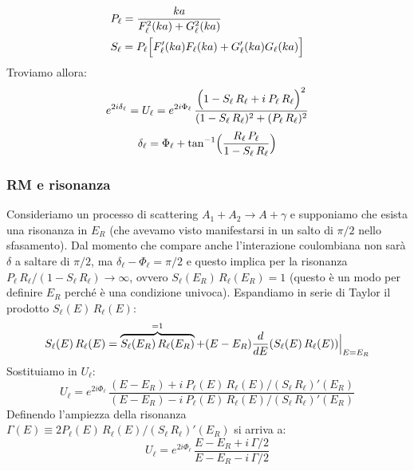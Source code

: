 \begin{displaymath}
	\begin{aligned}
	&P_\ell = \frac{ka}{F_\ell^2 (ka) + G_\ell^2 (ka)}\\ 
	&S_\ell = P_\ell \Bigl [ F_\ell ' (ka) F_\ell (ka) + G_\ell ' (ka)G_\ell (ka) \Bigr ]
	\end{aligned}
\end{displaymath}
Troviamo allora:
$$e^{2i\delta_\ell} = U_\ell = e^{2i\Phi_\ell} \, \frac{\Bigl ( 1-S_\ell\, R_\ell + i\: P_\ell\, R_\ell \Bigr )^2}{(1-S_\ell\, R_\ell)^2 + (P_\ell \, R_\ell)^2}$$
\begin{equation}\label{0412_delta}
\delta_\ell = \Phi_\ell + \tan^{-1} \Bigl ( \frac{R_\ell\, P_\ell}{1-S_\ell\, R_\ell} \Bigr ) 
\end{equation}

\subsubsection{RM e risonanza}
Consideriamo un processo di scattering $A_1 + A_2 \to A + \gamma$ e supponiamo che esista una risonanza in $E_R$ (che avevamo visto manifestarsi in un salto di $\pi/2$ nello sfasamento). Dal momento che compare anche l'interazione coulombiana non sarà $\delta$ a saltare di $\pi/2$, ma $\delta_\ell -\Phi_\ell = \pi/2$ e questo implica per la risonanza $P_\ell\, R_\ell / (1-S_\ell\, R_\ell) \to \infty$, ovvero $S_\ell (E_R)\, R_\ell(E_R) =1 $ (questo è un modo per definire $E_R$ perché è una condizione univoca). Espandiamo in serie di Taylor il prodotto $S_\ell(E)\, R_\ell(E)$:
$$S_\ell(E)\, R_\ell(E) = \overbrace{S_\ell(E_R)\, R_\ell(E_R)}^{=1} + (E-E_R) \frac{d}{dE}(S_\ell(E)\, R_\ell(E))\Bigl |_{E=E_R}$$
Sostituiamo in $U_\ell$:
$$U_\ell = e^{2i\Phi_\ell} \, \frac{(E-E_R)+i\: P_\ell (E)\, R_\ell (E) /(S_\ell\, R_\ell)' (E_R)}{(E-E_R)- i \: P_\ell (E)\, R_\ell(E) / (S_\ell\,R_\ell)' (E_R)}$$
Definendo l'ampiezza della risonanza $\Gamma (E) \equiv 2P_\ell (E) \, R_\ell (E) / (S_\ell \, R_\ell)' (E_R)$ si arriva a:
\begin{equation}\label{0412_risUl}
U_\ell = e^{2i\Phi_\ell} \, \frac{E-E_R + i\, \Gamma/2}{E-E_R - i\,\Gamma/2}
\end{equation}

